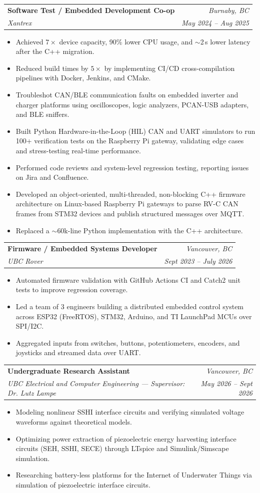 \documentclass[letterpaper,11pt]{article}
\makeatletter
\newcommand{\resumeItem}[1]{
  \item\small{
    {#1 \vspace{-2pt}}
  }
}
\newcommand{\resumeSubheading}[4]{
  \vspace{-2pt}\item
    \begin{tabular*}{0.97\textwidth}[t]{l@{\extracolsep{\fill}}r}
      \textbf{#1} & \textit{\small #4} \\
      \textit{\small#3} & \textit{\small #2} \\
    \end{tabular*}\vspace{-7pt}
}
\newcommand{\resumeItemListStart}{\begin{itemize}[leftmargin=0.2in]}
\newcommand{\resumeItemListEnd}{\end{itemize}\vspace{-5pt}}
\makeatother
\begin{document}
\resumeSubheading
      {Software Test / Embedded Development Co-op}{May 2024 -- Aug 2025}
      {Xantrex}{Burnaby, BC}
      \resumeItemListStart
        \resumeItem{Achieved $7\times$ device capacity, 90\% lower CPU usage, and $\sim$2\,s lower latency after the C++ migration.}
        \resumeItem{Reduced build times by $5\times$ by implementing CI/CD cross-compilation pipelines with Docker, Jenkins, and CMake.}
        \resumeItem{Troubleshot CAN/BLE communication faults on embedded inverter and charger platforms using oscilloscopes, logic analyzers, PCAN-USB adapters, and BLE sniffers.}
        \resumeItem{Built Python Hardware-in-the-Loop (HIL) CAN and UART simulators to run 100+ verification tests on the Raspberry Pi gateway, validating edge cases and stress-testing real-time performance.}
        \resumeItem{Performed code reviews and system-level regression testing, reporting issues on Jira and Confluence.}
        \resumeItem{Developed an object-oriented, multi-threaded, non-blocking C++ firmware architecture on Linux-based Raspberry Pi gateways to parse RV-C CAN frames from STM32 devices and publish structured messages over MQTT.}
        \resumeItem{Replaced a $\sim$60k-line Python implementation with the C++ architecture.}
      \resumeItemListEnd

    \resumeSubheading
      {Firmware / Embedded Systems Developer}{Sept 2023 -- July 2026}
      {UBC Rover}{Vancouver, BC}
      \resumeItemListStart
        \resumeItem{Automated firmware validation with GitHub Actions CI and Catch2 unit tests to improve regression coverage.}
        \resumeItem{Led a team of 3 engineers building a distributed embedded control system across ESP32 (FreeRTOS), STM32, Arduino, and TI LaunchPad MCUs over SPI/I2C.}
        \resumeItem{Aggregated inputs from switches, buttons, potentiometers, encoders, and joysticks and streamed data over UART.}
      \resumeItemListEnd

    \resumeSubheading
      {Undergraduate Research Assistant}{May 2026 -- Sept 2026}
      {UBC Electrical and Computer Engineering --- Supervisor: Dr. Lutz Lampe}{Vancouver, BC}
      \resumeItemListStart
        \resumeItem{Modeling nonlinear SSHI interface circuits and verifying simulated voltage waveforms against theoretical models.}
        \resumeItem{Optimizing power extraction of piezoelectric energy harvesting interface circuits (SEH, SSHI, SECE) through LTspice and Simulink/Simscape simulation.}
        \resumeItem{Researching battery-less platforms for the Internet of Underwater Things via simulation of piezoelectric interface circuits.}
      \resumeItemListEnd
\end{document}
